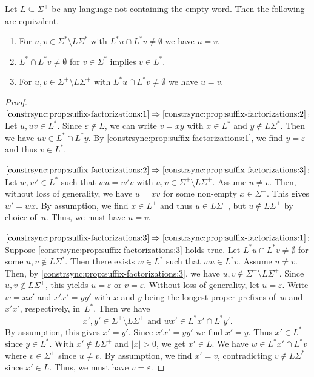 \begin{proposition}  \label{constrsync:prop:suffix-factorizations}
	Let $L \subseteq \Sigma^+$ be any language not containing the empty word. Then the following are equivalent.
	\begin{enumerate}
		\item \label{constrsync:prop:suffix-factorizations:1} For $u,v \in \Sigma^* \setminus L\Sigma^*$ with $L^* u \cap L^* v \ne \emptyset$ we have $u = v$. 
		
		\item \label{constrsync:prop:suffix-factorizations:2} $L^* \cap L^* v \ne \emptyset$ for $v \in \Sigma^*$ implies $v \in L^*$.
		
		\item \label{constrsync:prop:suffix-factorizations:3} For $u,v \in \Sigma^+ \setminus L\Sigma^+$ with $L^* u \cap L^* v \ne \emptyset$ we have $u = v$.
	\end{enumerate}
\end{proposition}
\begin{proof}
	$\ref{constrsync:prop:suffix-factorizations:1} \Rightarrow \ref{constrsync:prop:suffix-factorizations:2}$: 
	Let $u, uv \in L^*$. Since $\varepsilon \notin L$, we can write $v = xy$
	with $x \in L^*$ and $y \notin L\Sigma^*$.
	Then we have $uv \in L^* \cap L^*y$. By \cref{constrsync:prop:suffix-factorizations:1}, we find $y = \varepsilon$
	and thus $v \in L^*$.
	
	$\ref{constrsync:prop:suffix-factorizations:2} \Rightarrow \ref{constrsync:prop:suffix-factorizations:3}$: 
	Let $w,w' \in L^*$ such that $wu = w'v$ with $u,v \in \Sigma^+ \setminus L\Sigma^+$.
	Assume $u \ne v$. Then, without loss of generality,
	we have $u = xv$ for some non-empty $x \in \Sigma^+$.
	This gives $w' = wx$. By assumption, we find $x \in L^+$
	and thus $u \in L\Sigma^+$, but $u \notin L \Sigma^+$ by choice of~$u$.
	Thus, we must have $u = v$.
	
	$\ref{constrsync:prop:suffix-factorizations:3} \Rightarrow \ref{constrsync:prop:suffix-factorizations:1}$: Suppose \cref{constrsync:prop:suffix-factorizations:3} holds true.
	Let $L^* u \cap L^* v \ne \emptyset$ for some $u,v \notin L\Sigma^*$.
	Then there exists $w \in L^*$
	such that $wu \in L^*v$.
	Assume $u \ne v$. 
	Then, by \cref{constrsync:prop:suffix-factorizations:3},
	we have $u,v \notin \Sigma^+ \setminus L \Sigma^+$.
	Since $u,v \notin L \Sigma^+$,
	this yields $u = \varepsilon$ or $v = \varepsilon$.
	Without loss of generality, let $u = \varepsilon$.	
	Write $w = xx'$ and $x'x' = yy'$ with $x$ and $y$ being the longest proper prefixes of~$w$ and $x'x'$, respectively, in~$L^*$. Then we have 
	\[
	x', y' \in \Sigma^+ \setminus L\Sigma^+
	\text{ and }
	wx' \in L^* x' \cap L^* y'.
	\]
	By assumption, this gives $x' = y'$.
	Since $x'x' = yy'$ we find $x' = y$.
	Thus $x' \in L^*$ since $y \in L^*$. With $x' \notin L\Sigma^+$ and $|x| > 0$,
	we get $x' \in L$.	
	We have $w \in L^* x' \cap L^* v$ where $v \in \Sigma^+$ since $u \ne v$.
	By assumption, we find $x' = v$, contradicting $v \notin L \Sigma^*$ since $x' \in L$.
	Thus, we must have $v = \varepsilon$.
\end{proof}

